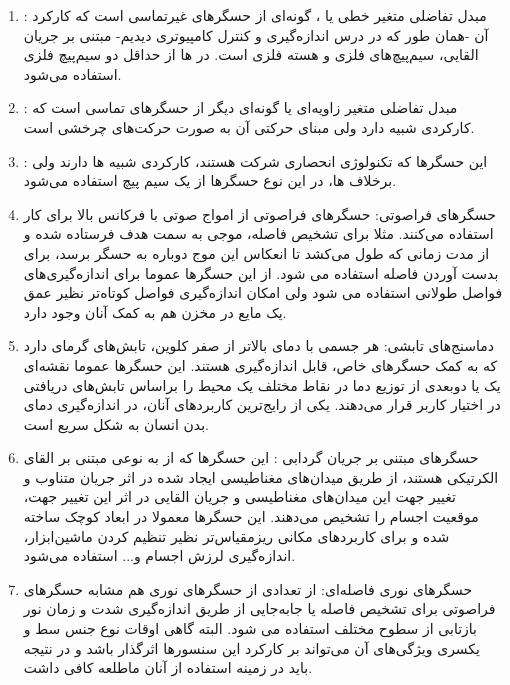 \documentclass[conference]{IEEEtran-ModifiedForMVIP}
\begin{document}
\begin{enumerate}
	\item {}: مبدل تفاضلی متغیر خطی یا ، گونه‌ای از حسگر‌های غیرتماسی است  که  کارکرد آن -همان طور که در درس اندازه‌گیری و کنترل کامپیوتری دیدیم- مبتنی بر جریان القایی، سیم‌پیچ‌های فلزی و هسته فلزی است. در  ها از حداقل دو سیم‌پیچ فلزی استفاده می‌شود. 
	\cite{varriohm_2020}
	
	\item {}: مبدل تفاضلی متغیر زاویه‌ای یا  گونه‌ای دیگر از حسگر‌های تماسی است که کارکردی شبیه  دارد ولی مبنای حرکتی آن به صورت حرکت‌های چرخشی است.
	\cite{varriohm_2020}
	
	\item
	:
	این حسگر‌ها که تکنولوژی انحصاری شرکت  هستند، کارکردی شبیه  ها دارند ولی برخلاف  ها، در این نوع حسگر‌ها از یک سیم پیچ استفاده می‌شود.
	\cite{varriohm_2020}
	
	\item
	حسگرهای فراصوتی: حسگرهای فراصوتی
	از امواج صوتی با فرکانس بالا برای کار استفاده می‌کنند. مثلا برای تشخیص فاصله، موجی به سمت هدف فرستاده شده و از مدت زمانی که طول می‌کشد تا انعکاس این موج دوباره به حسگر برسد، برای بدست آوردن فاصله استفاده می شود. از این حسگر‌ها عموما برای اندازه‌گیری‌های فواصل طولانی استفاده می شود ولی امکان اندازه‌گیری فواصل کوتاه‌تر نظیر عمق یک مایع در مخزن هم به کمک آنان وجود دارد. \cite{edwards_2017}
	
	\item دماسنج‌های تابشی:
	هر جسمی با دمای بالاتر از صفر کلوین، تابش‌های گرمای دارد که به کمک حسگر‌های خاص، قابل اندازه‌گیری هستند. این حسگر‌ها عموما نقشه‌ای یک یا دوبعدی از توزیع دما در نقاط مختلف یک محیط را براساس تابش‌های دریافتی در اختیار کاربر قرار می‌دهند. یکی از رایج‌ترین کاربردهای آنان، در اندازه‌گیری دمای بدن انسان به شکل سریع است. \cite{edwards_2017}
	
		\item حسگر‌های مبتنی بر جریان گردابی
	:
	این حسگر‌ها که از به نوعی مبتنی بر القای الکرتیکی هستند، از طریق میدان‌های مغناطیسی ایجاد شده در اثر جریان متناوب و تغییر جهت این میدان‌های مغناطیسی و جریان القایی در اثر این تغییر جهت، موقعیت اجسام را تشخیص می‌دهند. این حسگر‌ها معمولا در ابعاد کوچک ساخته شده و برای کاربرد‌های مکانی ریزمقیاس‌تر نظیر تنظیم کردن ماشین‌ابزار، اندازه‌گیری لرزش اجسام و... استفاده می‌شود.	\cite{ixthus_instrumentation_what_nodate}
	
	\item 
	حسگر‌های نوری فاصله‌ای: از تعدادی از حسگر‌های نوری هم مشابه حسگرهای فراصوتی برای تشخیص فاصله یا جابه‌جایی از طریق اندازه‌گیری شدت و زمان نور بازتابی از سطوح مختلف استفاده می شود. البته گاهی اوقات نوع جنس سط و یکسری ویژگی‌های آن می‌تواند بر کارکرد این سنسورها اثرگذار باشد و در نتیجه باید در زمینه استفاده از آنان ماطلعه کافی داشت.
	\cite{edwards_2017}
	

\end{enumerate}
\end{document}
